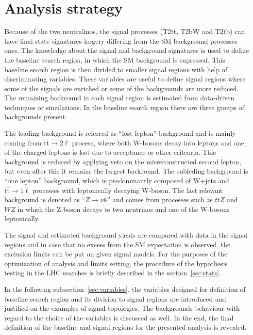 \section{Analysis strategy}

Because of the two neutralinos, the signal processes (T2tt, T2bW and T2tb)  can have final state signatures largery differing from the SM background processes ones. The knowledge about the signal and background signatures is used to define the baseline search region, in which the SM background is supressed. This baseline search region is then divided to smaller signal regions with help of discriminating variables. These variables are useful to define signal regions where some of the signals are enriched or some of the backgrounds are more reduced. The remaining backround in each signal region is estimated from data-driven techniques or simulations. In the baseline search region there are three groups of backgrounds present. 

The leading background is referred as ``lost lepton'' background and is mainly coming from $\mathrm{t\bar{t}} \to 2 \ell$ process, where both W-bosons decay into leptons and one of the charged leptons is lost due to acceptance or other critearia. This background is reduced by applying veto on the misreconstructed second lepton, but even after this it remains the largest backround. The subleding background is ``one lepton'' background, which is predominantly composed of W+jets and $\mathrm{t\bar{t}} \to 1 \ell$ processes with leptonically decaying W-boson. The last relevant background is denoted as ``$Z \to \nu \bar{\nu}$'' and comes from processes such as $t\bar{t}Z$ and $WZ$ in which the Z-boson decays to two neutrinos and one of the W-bosons leptonically.  

The signal and estimated background yields are compared with data in the signal regions and in case that no excess from the SM expectation is observed, the exclusion limits can be put on given signal models. For the purposes of the optimization of analysis and limits setting, the procedure of the hypothesis testing in the LHC searches is briefly described in the section~\ref{sec:stats}. 

In the following subsection~\ref{sec:variables}, the variables designed for definition of baseline search region and its division to signal regions are introduced and justified on the examples of signal topologies. The backgrounds behaviour with regard to the choice of the variables is discussed as well. In the end, the final definition of the baseline and signal regions for the presented analysis is revealed.

